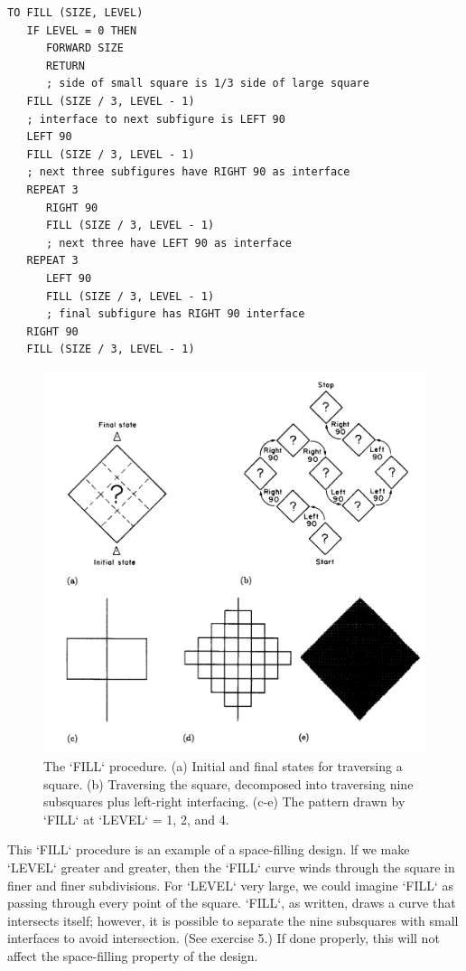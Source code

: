 \documentclass{book}
\begin{document}
\begin{verbatim}
TO FILL (SIZE, LEVEL)
   IF LEVEL = 0 THEN
      FORWARD SIZE
      RETURN
      ; side of small square is 1/3 side of large square
   FILL (SIZE / 3, LEVEL - 1)
   ; interface to next subfigure is LEFT 90
   LEFT 90
   FILL (SIZE / 3, LEVEL - 1)
   ; next three subfigures have RIGHT 90 as interface
   REPEAT 3
      RIGHT 90
      FILL (SIZE / 3, LEVEL - 1)
      ; next three have LEFT 90 as interface
   REPEAT 3
      LEFT 90
      FILL (SIZE / 3, LEVEL - 1)
      ; final subfigure has RIGHT 90 interface
   RIGHT 90
   FILL (SIZE / 3, LEVEL - 1)
\end{verbatim}
\begin{figure}
\begin{center}
\includegraphics[scale=1]{fig2-27}
\caption{The \textsc{`FILL`} procedure. (a) Initial and final states for traversing a square. (b) Traversing the square, decomposed into traversing nine subsquares plus left-right interfacing. (c-e) The pattern drawn by \textsc{`FILL`} at \textsc{`LEVEL`} = 1, 2, and 4.}
\end{center}
\end{figure}

This \textsc{`FILL`} procedure is an example of a space-filling design. lf we
make \textsc{`LEVEL`} greater and greater, then the \textsc{`FILL`} curve winds through the
square in finer and finer subdivisions. For \textsc{`LEVEL`} very large, we could
imagine \textsc{`FILL`} as passing through every point of the square. \textsc{`FILL`}, as
written, draws a curve that intersects itself; however, it is possible to
separate the nine subsquares with small interfaces to avoid intersection.
(See exercise 5.) If done properly, this will not affect the space-filling
property of the design.
\end{document}
